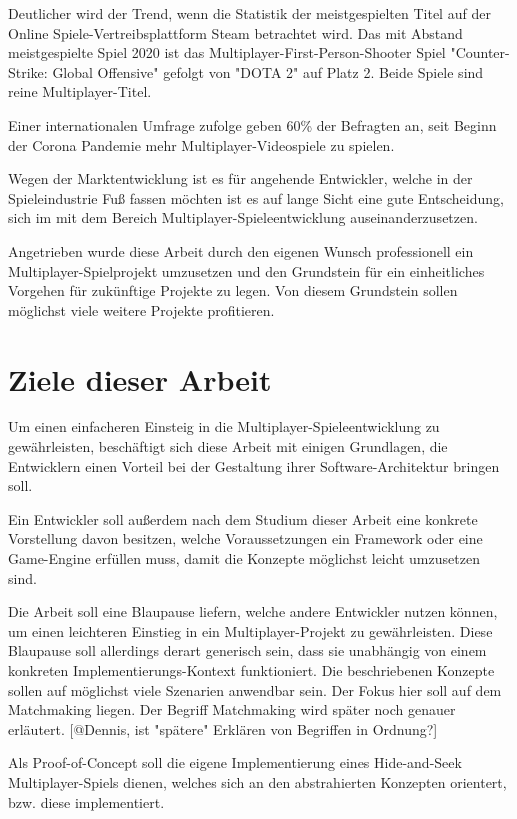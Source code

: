 Deutlicher wird der Trend, wenn die Statistik der meistgespielten Titel auf der Online Spiele-Vertreibsplattform Steam betrachtet wird. Das mit Abstand meistgespielte Spiel 2020 ist das Multiplayer-First-Person-Shooter Spiel "Counter-Strike: Global Offensive" gefolgt von "DOTA 2" auf Platz 2. Beide Spiele sind reine Multiplayer-Titel.\cite{GitHyp.February2021}

Einer internationalen Umfrage zufolge geben 60\% der Befragten an, seit Beginn der Corona Pandemie mehr Multiplayer-Videospiele zu spielen. \cite{SimonKucher&Partners.2020}

Wegen der Marktentwicklung ist es für angehende Entwickler, welche in der Spieleindustrie Fuß fassen möchten ist es auf lange Sicht eine gute Entscheidung, sich im mit dem Bereich Multiplayer-Spieleentwicklung auseinanderzusetzen.

Angetrieben wurde diese Arbeit durch den eigenen Wunsch professionell ein Multiplayer-Spielprojekt umzusetzen und den Grundstein für ein einheitliches Vorgehen für zukünftige Projekte zu legen. Von diesem Grundstein sollen möglichst viele weitere Projekte profitieren. 

\section{Ziele dieser Arbeit}

Um einen einfacheren Einsteig in die Multiplayer-Spieleentwicklung zu gewährleisten, beschäftigt sich diese Arbeit mit einigen Grundlagen, die Entwicklern einen Vorteil bei der Gestaltung ihrer Software-Architektur bringen soll.

Ein Entwickler soll außerdem nach dem Studium dieser Arbeit eine konkrete Vorstellung davon besitzen, welche Voraussetzungen ein Framework oder eine Game-Engine erfüllen muss, damit die Konzepte möglichst leicht umzusetzen sind.

Die Arbeit soll eine Blaupause liefern, welche andere Entwickler nutzen können, um einen leichteren Einstieg in ein Multiplayer-Projekt zu gewährleisten. Diese Blaupause soll allerdings derart generisch sein, dass sie unabhängig von einem konkreten Implementierungs-Kontext funktioniert. Die beschriebenen Konzepte sollen auf möglichst viele Szenarien anwendbar sein. Der Fokus hier soll auf dem Matchmaking liegen. Der Begriff Matchmaking wird später noch genauer erläutert. [@Dennis, ist "spätere" Erklären von Begriffen in Ordnung?]

Als Proof-of-Concept soll die eigene Implementierung eines Hide-and-Seek Multiplayer-Spiels dienen, welches sich an den abstrahierten Konzepten orientert, bzw. diese implementiert.

